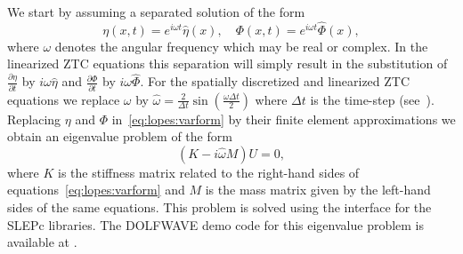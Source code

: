 We start by assuming  a separated  solution of the form
\begin{equation}
\label{eq:lopes:exp}
\eta(x,t)=e^{i\omega t}\hat\eta(x),\quad
\Phi(x,t)=e^{i\omega t}\hat\Phi(x),
\end{equation}
where $\omega$ denotes the angular frequency which may be real or
complex.  In the linearized ZTC equations this separation will simply
result in the substitution of $\frac{\partial \eta}{\partial t}$ by
$i\omega \hat\eta$ and $\frac{\partial \Phi}{\partial t}$ by $i\omega
\hat\Phi$.  For the spatially discretized and linearized ZTC equations
we replace $\omega$ by $\hat\omega=\frac{2}{\Delta
t}\sin\left(\frac{\omega \Delta t}{2}\right)$ where $\Delta t$ is the
time-step (see~\citet{LovholtPedersen2009}).  Replacing $\eta$ and
$\Phi$ in~\eqref{eq:lopes:varform} by their finite element
approximations we obtain an eigenvalue problem of the form
\begin{equation}
  \label{eq:lopes:eigenvalue}
(K- i\hat\omega M) U=0,
\end{equation}
where $K$ is the stiffness matrix related to the right-hand sides of
equations~\eqref{eq:lopes:varform} and $M$ is the mass matrix given by
the left-hand sides of the same equations.  This problem is solved
using the \dolfin interface for the SLEPc libraries.  The DOLFWAVE
demo code for this eigenvalue problem is available at
.

